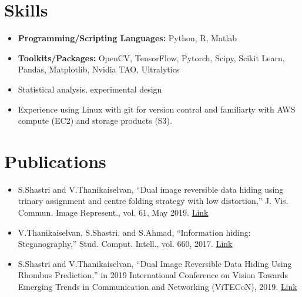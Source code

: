 \documentclass[a4paper,11pt]{article}
\begin{document}
\section{Skills}
	\begin{itemize}[leftmargin=*, itemsep = -2pt]
		\item{\textbf{Programming/Scripting Languages:}{ Python, R, Matlab}}
		\item{\textbf{Toolkits/Packages:}{ OpenCV, TensorFlow, Pytorch, Scipy, Scikit Learn, Pandas, Matplotlib, Nvidia TAO, Ultralytics}}
		\item{Statistical analysis, experimental design}
    \item{Experience using Linux with git for version control and familiarty with AWS compute (EC2) and storage products (S3).}
	\end{itemize}

\section{Publications}
	\begin{itemize}[leftmargin=*, itemsep = -4pt]
    \item{S.Shastri and V.Thanikaiselvan, “Dual image reversible data hiding using trinary assignment and centre folding strategy with low distortion,” J. Vis. Commun. Image Represent., vol. 61, May 2019. \href{https://doi.org/10.1016/j.jvcir.2019.03.022}{Link}}
		\item{V.Thanikaiselvan, S.Shastri, and S.Ahmad, “Information hiding: Steganography,” Stud. Comput. Intell., vol. 660, 2017. \href{https://doi.org/10.1007/978-3-319-44790-2\_4}{Link}}
    \item{S.Shastri and V.Thanikaiselvan, “Dual Image Reversible Data Hiding Using Rhombus Prediction,” in 2019 International Conference on Vision Towards Emerging Trends in Communication and Networking (ViTECoN), 2019. \href{https://doi.org/10.1109/ViTECoN.2019.8899667}{Link}}
   \end{itemize}
\end{document}
